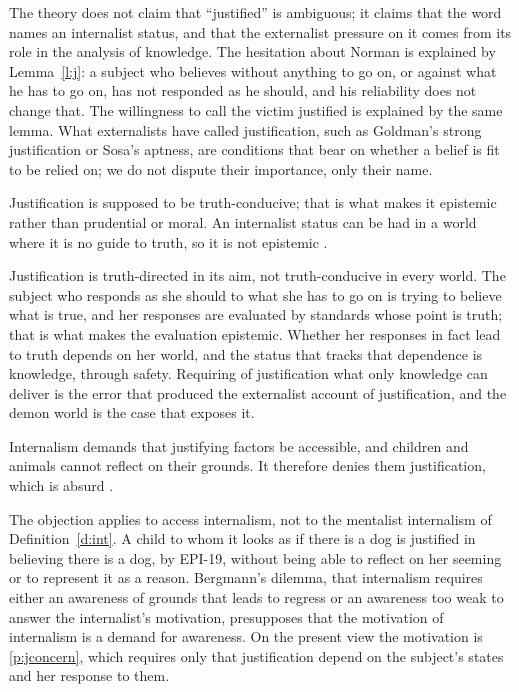 \documentclass{situationist-preprint}
\begin{document}
\begin{reply}
The theory does not claim that \enquote{justified} is ambiguous; it claims that the word names an internalist status, and that the externalist pressure on it comes from its role in the analysis of knowledge. The hesitation about Norman is explained by Lemma~\ref{l:j}: a subject who believes without anything to go on, or against what he has to go on, has not responded as he should, and his reliability does not change that. The willingness to call the victim justified is explained by the same lemma. What externalists have called justification, such as Goldman's strong justification or Sosa's aptness, are conditions that bear on whether a belief is fit to be relied on; we do not dispute their importance, only their name.
\end{reply}

\begin{objection}
Justification is supposed to be truth-conducive; that is what makes it epistemic rather than prudential or moral. An internalist status can be had in a world where it is no guide to truth, so it is not epistemic \citep{BonJour1985}.
\end{objection}

\begin{reply}
Justification is truth-directed in its aim, not truth-conducive in every world. The subject who responds as she should to what she has to go on is trying to believe what is true, and her responses are evaluated by standards whose point is truth; that is what makes the evaluation epistemic. Whether her responses in fact lead to truth depends on her world, and the status that tracks that dependence is knowledge, through safety. Requiring of justification what only knowledge can deliver is the error that produced the externalist account of justification, and the demon world is the case that exposes it.
\end{reply}

\begin{objection}[Overintellectualization]
Internalism demands that justifying factors be accessible, and children and animals cannot reflect on their grounds. It therefore denies them justification, which is absurd \citep{Bergmann2006}.
\end{objection}

\begin{reply}
The objection applies to access internalism, not to the mentalist internalism of Definition~\ref{d:int}. A child to whom it looks as if there is a dog is justified in believing there is a dog, by EPI-19, without being able to reflect on her seeming or to represent it as a reason. Bergmann's dilemma, that internalism requires either an awareness of grounds that leads to regress or an awareness too weak to answer the internalist's motivation, presupposes that the motivation of internalism is a demand for awareness. On the present view the motivation is \ref{p:jconcern}, which requires only that justification depend on the subject's states and her response to them.
\end{reply}
\end{document}
